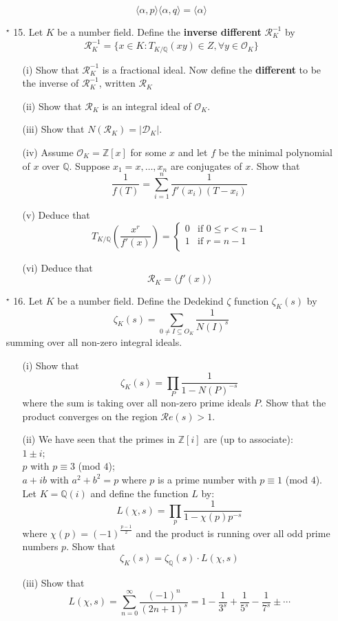 \begin{enumerate}
$$\langle \alpha,p \rangle \langle \alpha,q \rangle =\langle \alpha \rangle$$
\item[$^\star$ 15.] Let $K$ be a number field. Define the {\bf inverse different} $\mathcal{R}^{-1}_K$ by
$$\mathcal{R}^{-1}_K= \{x \in K : T_{K/\mathbb{Q}}(xy) \in Z, \forall y \in \mathcal{O}_K\}$$
\begin{enumerate}
\item[(i)] Show that $\mathcal{R}^{-1}_K$ is a fractional ideal.
Now define the {\bf different} to be the inverse of $\mathcal{R}^{-1}_K$, written $\mathcal{R}_K$
\item[(ii)] Show that $\mathcal{R}_K$ is an integral ideal of $\mathcal{O}_K$.
\item[(iii)] Show that $N(\mathcal{R}_K)=|\mathcal{D}_K|$.
\item[(iv)] Assume $\mathcal{O}_K=\mathbb{Z}[x]$ for some $x$ and let $f$ be the minimal polynomial of $x$ over $\mathbb{Q}$. Suppose $x_1=x,\ldots,x_n$ are conjugates of $x$. Show that
$$\frac{1}{f(T)}=\sum_{i=1}^n\frac{1}{f'(x_i)(T-x_i)}$$
\item[(v)] Deduce that \begin{equation*}
T_{K/\mathbb{Q}}\left(\frac{x^r}{f'(x)}\right)= \left\{
\begin{array}{ll}
0 & \text{if } 0 \le r <n-1\\
1 & \text{if } r=n-1\\
\end{array} \right.
\end{equation*}
\item[(vi)] Deduce that $$\mathcal{R}_K =\langle f'(x) \rangle$$
\end{enumerate}
\item[$^\star$ 16.] Let $K$ be a number field. Define the Dedekind $\zeta$ function $\zeta_K(s)$ by
$$\zeta_K(s)=\sum_{0 \neq I \subseteq O_K}\frac{1}{N(I)^s}$$
summing over all non-zero integral ideals.
\begin{enumerate}
\item[(i)] Show that
$$\zeta_K(s)=\prod_P \frac{1}{1-N(P)^{-s}}$$
where the sum is taking over all non-zero prime ideals $P$. Show that the product converges on the region
$\mathcal{R}e(s)>1$.
\item[(ii)] We have seen that the primes in $\mathbb{Z}[i]$ are (up to associate):\\
$1\pm i$;\\
$p$ with $p \equiv 3$ (mod $4$);\\
$a+ib$ with $a^2+b^2=p$ where $p$ is a prime number with $p \equiv 1$ (mod $4$).\\
Let $K=\mathbb{Q}(i)$ and define the function $L$ by:
$$L(\chi,s)=\prod_p \frac{1}{1-\chi(p)p^{-s}}$$ where
$\chi(p)=(-1)^{\frac{p-1}{2}}$ and the product is running over all odd prime numbers $p$. Show that
$$\zeta_K(s)=\zeta_\mathbb{Q}(s) \cdot L(\chi,s)$$
\item[(iii)] Show that
$$L(\chi,s)=\sum_{n=0}^\infty \frac{(-1)^n}{(2n+1)^s}=1-\frac{1}{3^s}+\frac{1}{5^s}-\frac{1}{7^s}\pm\cdots$$
\end{enumerate}
\end{enumerate}

